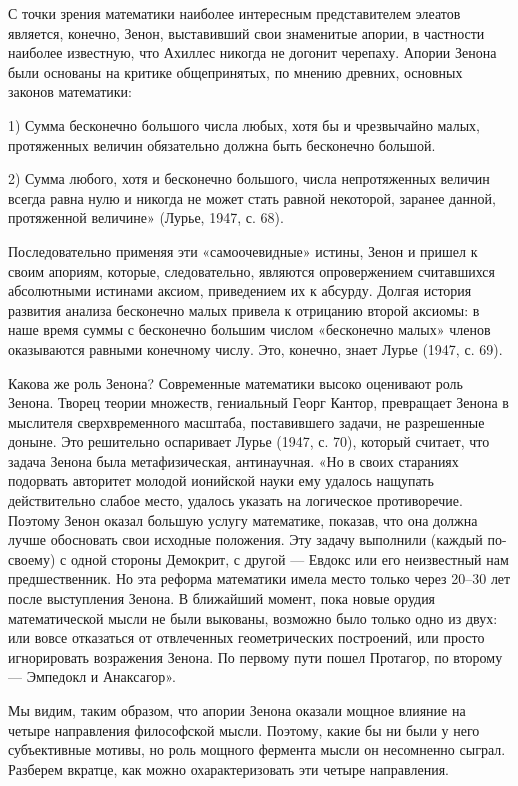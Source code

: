 С точки  зрения математики наиболее интересным  представителем элеатов
является,  конечно,  Зенон,  выставивший  свои  знаменитые  апории,  в
частности наиболее известную, что Ахиллес никогда не догонит черепаху.
Апории  Зенона  были  основаны  на  критике  общепринятых,  по  мнению
древних, основных законов математики:

1) Сумма бесконечно большого числа любых, хотя бы и чрезвычайно малых,
протяженных величин обязательно должна быть бесконечно большой.

2)  Сумма  любого, хотя  и  бесконечно  большого, числа  непротяженных
величин всегда равна  нулю и никогда не может  стать равной некоторой,
заранее данной, протяженной величине» (Лурье, 1947, с. 68).

Последовательно применяя  эти «самоочевидные»  истины, Зенон  и пришел
к  своим  апориям,   которые,  следовательно,  являются  опровержением
считавшихся  абсолютными истинами  аксиом, приведением  их к  абсурду.
Долгая история  развития анализа бесконечно малых  привела к отрицанию
второй  аксиомы:  в  наше  время суммы  с  бесконечно  большим  числом
«бесконечно малых»  членов оказываются  равными конечному  числу. Это,
конечно, знает Лурье (1947, с. 69).

Какова же  роль Зенона?  Современные математики высоко  оценивают роль
Зенона. Творец  теории множеств,  гениальный Георг  Кантор, превращает
Зенона в  мыслителя сверхвременного масштаба, поставившего  задачи, не
разрешенные  доныне. Это  решительно оспаривает  Лурье (1947,  с. 70),
который считает,  что задача Зенона была  метафизическая, антинаучная.
«Но  в своих  стараниях  подорвать авторитет  молодой ионийской  науки
ему  удалось  нащупать  действительно слабое  место,  удалось  указать
на  логическое  противоречие.  Поэтому  Зенон  оказал  большую  услугу
математике,  показав, что  она должна  лучше обосновать  свои исходные
положения.  Эту задачу  выполнили (каждый  по-своему) с  одной стороны
Демокрит, с другой --- Евдокс  или его неизвестный нам предшественник.
Но  эта  реформа  математики  имела  место  только  через  20--30  лет
после  выступления  Зенона.  В  ближайший момент,  пока  новые  орудия
математической мысли  не были выкованы,  возможно было только  одно из
двух: или  вовсе отказаться от отвлеченных  геометрических построений,
или  просто  игнорировать возражения  Зенона.  По  первому пути  пошел
Протагор, по второму --- Эмпедокл и Анаксагор».

Мы видим, таким  образом, что апории Зенона оказали  мощное влияние на
четыре направления философской мысли. Поэтому, какие бы ни были у него
субъективные  мотивы, но  роль  мощного фермента  мысли он  несомненно
сыграл.  Разберем  вкратце,  как  можно  охарактеризовать  эти  четыре
направления.

